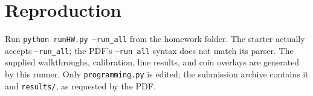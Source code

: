 \documentclass[10pt]{article}
\begin{document}
\section{Reproduction}
Run \texttt{python runHW.py --run\_all} from the homework folder. The starter actually accepts \texttt{--run\_all}; the PDF's \texttt{--run all} syntax does not match its parser. The supplied walkthroughs, calibration, line results, and coin overlays are generated by this runner. Only \texttt{programming.py} is edited; the submission archive contains it and \texttt{results/}, as requested by the PDF.
\end{document}
